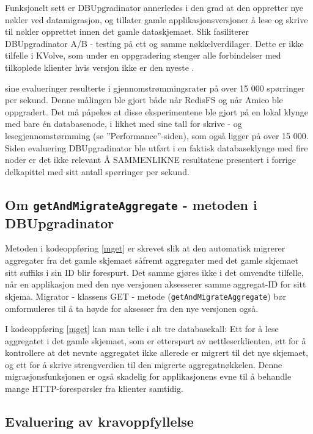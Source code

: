 Funksjonelt sett er DBUpgradinator annerledes i den grad at den oppretter nye nøkler ved datamigrasjon, og tillater gamle applikasjonsversjoner å lese og skrive til nøkler opprettet innen det gamle dataskjemaet. Slik fasiliterer DBUpgradinator A/B - testing på ett og samme nøkkelverdi\-lager. Dette er ikke tilfelle i KVolve, som under en oppgradering stenger alle forbindelser med tilkoplede klienter hvis versjon ikke er den nyeste \citep[p.~5]{saur2016}.

\cite{saur2016} sine evalueringer resulterte i gjennomstrømmingsrater på over 15 000 spørringer per sekund. Denne målingen ble gjort både når RedisFS og når Amico ble oppgradert. Det må påpekes at disse eksperimentene ble gjort på en lokal klynge med bare én databasenode, i likhet med \cite{kreps2009} sine tall for skrive - og lesegjennomstørmming (se ''Performance''-siden), som også ligger på over 15 000. Siden evaluering DBUpgradinator ble utført i en faktisk databaseklynge med fire noder er det ikke relevant Å SAMMENLIKNE resultatene presentert i forrige delkapittel med \cite[p.~8]{saur2016} sitt antall spørringer per sekund.

\subsection{Om \texttt{getAndMigrateAggregate} - metoden i DBUpgradinator}

Metoden i kodeoppføring \ref{mget} er skrevet slik at den automatisk migrerer aggregater fra det gamle skjemaet såfremt aggregater med det gamle skjemaet sitt suffiks i sin ID blir forespurt. Det samme gjøres ikke i det omvendte tilfelle, når en applikasjon med den nye versjonen aksesserer samme aggregat-ID for sitt skjema. Migrator - klassens GET - metode (\texttt{getAndMigrateAggregate}) bør omformuleres til å ta høyde for aksesser fra den nye versjonen også.

I kodeoppføring \ref{mget} kan man telle i alt tre databasekall: Ett for å lese aggregatet i det gamle skjemaet, som er etterspurt av nettleserklienten, ett for å kontrollere at det nevnte aggregatet ikke allerede er migrert til det nye skjemaet, og ett for å skrive strengverdien til den migrerte aggregatnøkkelen. Denne migrasjonsfunksjonen er også skadelig for applikasjonens evne til å behandle mange HTTP-forespørsler fra klienter samtidig.

\subsection{Evaluering av kravoppfyllelse}


